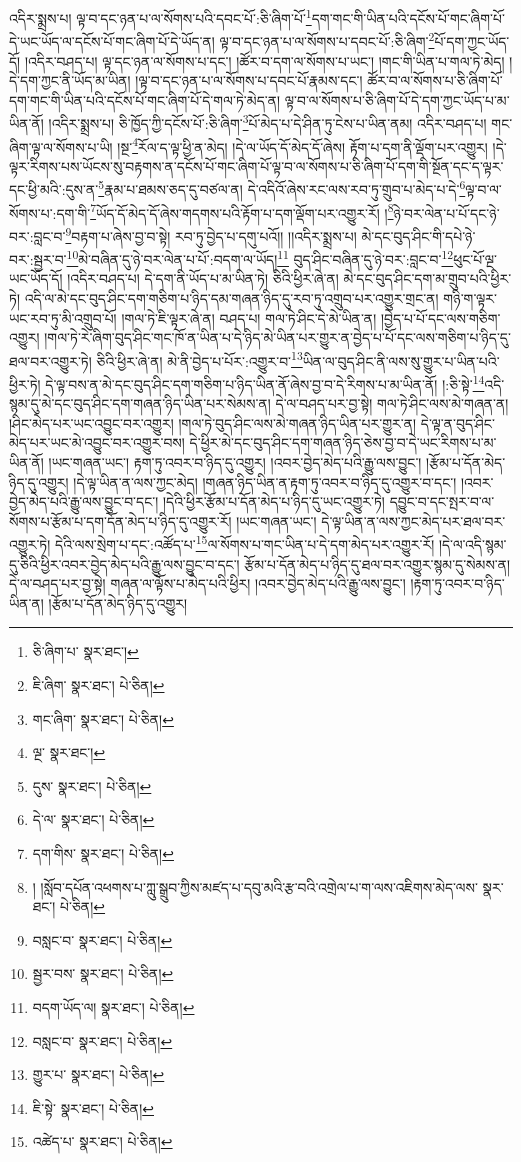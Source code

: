 འདིར་སྨྲས་པ། ལྟ་བ་དང་ཉན་པ་ལ་སོགས་པའི་དབང་པོ་:ཅི་ཞིག་པོ་\footnote{ཅི་ཞིག་པ་  སྣར་ཐང་། }དག་གང་གི་ཡིན་པའི་དངོས་པོ་གང་ཞིག་པོ་དེ་ཡང་ཡོད་ལ་དངོས་པོ་གང་ཞིག་པོ་དེ་ཡོད་ན། ལྟ་བ་དང་ཉན་པ་ལ་སོགས་པ་དབང་པོ་:ཅི་ཞིག་\footnote{ཇི་ཞིག་  སྣར་ཐང་།  པེ་ཅིན། }པོ་དག་ཀྱང་ཡོད་དོ། །འདིར་བཤད་པ། ལྟ་དང་ཉན་ལ་སོགས་པ་དང་། །ཚོར་བ་དག་ལ་སོགས་པ་ཡང་། །གང་གི་ཡིན་པ་གལ་ཏེ་མེད། །དེ་དག་ཀྱང་ནི་ཡོད་མ་ཡིན། །ལྟ་བ་དང་ཉན་པ་ལ་སོགས་པ་དབང་པོ་རྣམས་དང་། ཚོར་བ་ལ་སོགས་པ་ཅི་ཞིག་པོ་དག་གང་གི་ཡིན་པའི་དངོས་པོ་གང་ཞིག་པོ་དེ་གལ་ཏེ་མེད་ན། ལྟ་བ་ལ་སོགས་པ་ཅི་ཞིག་པོ་དེ་དག་ཀྱང་ཡོད་པ་མ་ཡིན་ནོ། །འདིར་སྨྲས་པ། ཅི་ཁྱོད་ཀྱི་དངོས་པོ་:ཅི་ཞིག་\footnote{གང་ཞིག་  སྣར་ཐང་།  པེ་ཅིན། }པོ་མེད་པ་དེ་ཤིན་ཏུ་ངེས་པ་ཡིན་ནམ། འདིར་བཤད་པ། གང་ཞིག་ལྟ་ལ་སོགས་པ་ཡི། །སྔ་\footnote{ལྔ་  སྣར་ཐང་། }རོལ་ད་ལྟ་ཕྱི་ན་མེད། །དེ་ལ་ཡོད་དོ་མེད་དོ་ཞེས། རྟོག་པ་དག་ནི་ལྡོག་པར་འགྱུར། །དེ་ལྟར་རིགས་པས་ཡོངས་སུ་བརྟགས་ན་དངོས་པོ་གང་ཞིག་པོ་ལྟ་བ་ལ་སོགས་པ་ཅི་ཞིག་པོ་དག་གི་སྔོན་དང་ད་ལྟར་དང་ཕྱི་མའི་:དུས་ན་\footnote{དུས་  སྣར་ཐང་།  པེ་ཅིན། }རྣམ་པ་ཐམས་ཅད་དུ་བཙལ་ན། དེ་འདིའོ་ཞེས་རང་ལས་རབ་ཏུ་གྲུབ་པ་མེད་པ་དེ་\footnote{དེ་ལ་  སྣར་ཐང་།  པེ་ཅིན། }ལྟ་བ་ལ་སོགས་པ་:དག་གི་\footnote{དག་གིས་  སྣར་ཐང་།  པེ་ཅིན། }ཡོད་དོ་མེད་དོ་ཞེས་གདགས་པའི་རྟོག་པ་དག་ལྡོག་པར་འགྱུར་རོ། །\footnote{། །སློབ་དཔོན་འཕགས་པ་ཀླུ་སྒྲུབ་ཀྱིས་མཛད་པ་དབུ་མའི་རྩ་བའི་འགྲེལ་པ་ག་ལས་འཇིགས་མེད་ལས་  སྣར་ཐང་།  པེ་ཅིན། }ཉེ་བར་ལེན་པ་པོ་དང་ཉེ་བར་:བླང་བ་\footnote{བསླང་བ་  སྣར་ཐང་།  པེ་ཅིན། }བརྟག་པ་ཞེས་བྱ་བ་སྟེ། རབ་ཏུ་བྱེད་པ་དགུ་པའོ།། །།འདིར་སྨྲས་པ། མེ་དང་བུད་ཤིང་གི་དཔེ་ཉེ་བར་:སྦྱར་བ་\footnote{སྦྱར་བས་  སྣར་ཐང་།  པེ་ཅིན། }མེ་བཞིན་དུ་ཉེ་བར་ལེན་པ་པོ་:བདག་ལ་ཡོད།\footnote{བདག་ཡོད་ལ།  སྣར་ཐང་།  པེ་ཅིན། } བུད་ཤིང་བཞིན་དུ་ཉེ་བར་:བླང་བ་\footnote{བསླང་བ་  སྣར་ཐང་།  པེ་ཅིན། }ཕུང་པོ་ལྔ་ཡང་ཡོད་དོ། །འདིར་བཤད་པ། དེ་དག་ནི་ཡོད་པ་མ་ཡིན་ཏེ། ཅིའི་ཕྱིར་ཞེ་ན། མེ་དང་བུད་ཤིང་དག་མ་གྲུབ་པའི་ཕྱིར་ཏེ། འདི་ལ་མེ་དང་བུད་ཤིང་དག་གཅིག་པ་ཉིད་དམ་གཞན་ཉིད་དུ་རབ་ཏུ་འགྲུབ་པར་འགྱུར་གྲང་ན། གཉི་ག་ལྟར་ཡང་རབ་ཏུ་མི་འགྲུབ་པོ། །གལ་ཏེ་ཇི་ལྟར་ཞེ་ན། བཤད་པ། གལ་ཏེ་ཤིང་དེ་མེ་ཡིན་ན། །བྱེད་པ་པོ་དང་ལས་གཅིག་འགྱུར། །གལ་ཏེ་རེ་ཞིག་བུད་ཤིང་གང་ཁོ་ན་ཡིན་པ་དེ་ཉིད་མེ་ཡིན་པར་གྱུར་ན་བྱེད་པ་པོ་དང་ལས་གཅིག་པ་ཉིད་དུ་ཐལ་བར་འགྱུར་ཏེ། ཅིའི་ཕྱིར་ཞེ་ན། མེ་ནི་བྱེད་པ་པོར་:འགྱུར་བ་\footnote{གྱུར་པ་  སྣར་ཐང་།  པེ་ཅིན། }ཡིན་ལ་བུད་ཤིང་ནི་ལས་སུ་གྱུར་པ་ཡིན་པའི་ཕྱིར་ཏེ། དེ་ལྟ་བས་ན་མེ་དང་བུད་ཤིང་དག་གཅིག་པ་ཉིད་ཡིན་ནོ་ཞེས་བྱ་བ་དེ་རིགས་པ་མ་ཡིན་ནོ། །:ཅི་སྟེ་\footnote{ཇི་སྟེ་  སྣར་ཐང་།  པེ་ཅིན། }འདི་སྙམ་དུ་མེ་དང་བུད་ཤིང་དག་གཞན་ཉིད་ཡིན་པར་སེམས་ན། དེ་ལ་བཤད་པར་བྱ་སྟེ། གལ་ཏེ་ཤིང་ལས་མེ་གཞན་ན། །ཤིང་མེད་པར་ཡང་འབྱུང་བར་འགྱུར། །གལ་ཏེ་བུད་ཤིང་ལས་མེ་གཞན་ཉིད་ཡིན་པར་གྱུར་ན། དེ་ལྟ་ན་བུད་ཤིང་མེད་པར་ཡང་མེ་འབྱུང་བར་འགྱུར་བས། དེ་ཕྱིར་མེ་དང་བུད་ཤིང་དག་གཞན་ཉིད་ཅེས་བྱ་བ་དེ་ཡང་རིགས་པ་མ་ཡིན་ནོ། །ཡང་གཞན་ཡང་། རྟག་ཏུ་འབར་བ་ཉིད་དུ་འགྱུར། །འབར་བྱེད་མེད་པའི་རྒྱུ་ལས་བྱུང་། །རྩོམ་པ་དོན་མེད་ཉིད་དུ་འགྱུར། །དེ་ལྟ་ཡིན་ན་ལས་ཀྱང་མེད། །གཞན་ཉིད་ཡིན་ན་རྟག་ཏུ་འབར་བ་ཉིད་དུ་འགྱུར་བ་དང་། །འབར་བྱེད་མེད་པའི་རྒྱུ་ལས་བྱུང་བ་དང་། །དེའི་ཕྱིར་རྩོམ་པ་དོན་མེད་པ་ཉིད་དུ་ཡང་འགྱུར་ཏེ། དབྱུང་བ་དང་སྤར་བ་ལ་སོགས་པ་རྩོམ་པ་དག་དོན་མེད་པ་ཉིད་དུ་འགྱུར་རོ། །ཡང་གཞན་ཡང་། དེ་ལྟ་ཡིན་ན་ལས་ཀྱང་མེད་པར་ཐལ་བར་འགྱུར་ཏེ། དེའི་ལས་སྲེག་པ་དང་:འཚོད་པ་\footnote{འཚེད་པ་  སྣར་ཐང་།  པེ་ཅིན། }ལ་སོགས་པ་གང་ཡིན་པ་དེ་དག་མེད་པར་འགྱུར་རོ། །དེ་ལ་འདི་སྙམ་དུ་ཅིའི་ཕྱིར་འབར་བྱེད་མེད་པའི་རྒྱུ་ལས་བྱུང་བ་དང་། རྩོམ་པ་དོན་མེད་པ་ཉིད་དུ་ཐལ་བར་འགྱུར་སྙམ་དུ་སེམས་ན། དེ་ལ་བཤད་པར་བྱ་སྟེ། གཞན་ལ་ལྟོས་པ་མེད་པའི་ཕྱིར། །འབར་བྱེད་མེད་པའི་རྒྱུ་ལས་བྱུང་། །རྟག་ཏུ་འབར་བ་ཉིད་ཡིན་ན། །རྩོམ་པ་དོན་མེད་ཉིད་དུ་འགྱུར། 